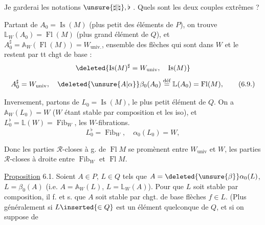 Je garderai les notations $\unsure{\sharp|\natural},\flat$   .
Quels sont les deux couples extrêmes ?

Partant de $A_0=\operatorname{Is}(M)$ (plus petit des éléments
de $P$), on trouve $\mathbb L_W(A_0)=\operatorname{Fl}(M)$ (plus grand
élément de $Q$), et $A_0^\sharp=\mathbb A_W(\operatorname{Fl}(M))=W_{\mathrm{univ.}}$,
ensemble des flèches qui sont dans $W$ et le
restent par tt chgt de base :
\[
\deleted{\operatorname{Is}(M)^\sharp=W_{\mathrm{univ}},\quad\operatorname{Is}(M)}
\]
\[
A_0^\sharp=W_{\mathrm{univ}},\quad
\deleted{\unsure{A|\alpha}}\beta_0(A_0)\overset{\text{déf}}{=}\mathbb L(A_0)=\operatorname{Fl}(M),
\tag*{(6.9.)}
\]

Inversement, partons de $L_0=\operatorname{Is}(M)$, le plus petit
élément de $Q$. On a $\mathbb A_W(L_0)=W$ ($W$
étant stable par composition et  les iso),
et $L_0^\flat=\mathbb L(W)=\operatorname{Fib}_W$, les $W$-fibrations.
\[
L_0^\flat=\operatorname{Fib}_W,\quad \alpha_0(L_0)=W,
\tag*{(6.10)}
\]

Donc les parties $\mathcal R$-closes à g. de $\operatorname{Fl} M$
se promènent entre $W_{\mathrm{univ}}$ et $W$, les
parties $\mathcal R$-closes à droite entre $\operatorname{Fib}_W$ et $\operatorname{Fl} M$.

\uline{Proposition} 6.1. Soient $A\in P$, $L\in Q$ tels
\llap{\smash{\rule[-4.9\baselineskip]{0.35pt}{5.2\baselineskip}}\hspace{0.5em}}que $A=\deleted{\unsure{\beta}}\alpha_0(L)$, $L=\beta_0(A)$ (i.e. $A=\mathbb A_W(L)$,
$L=\mathbb L_W(A)$). Pour que $L$ soit stable par
composition, il f. et s. que $A$ soit
stable par chgt. de base  
flèches $f\in L$. (Plus généralement si $L\inserted{\in Q}$ est
un élément quelconque de $Q$, et si on suppose de
